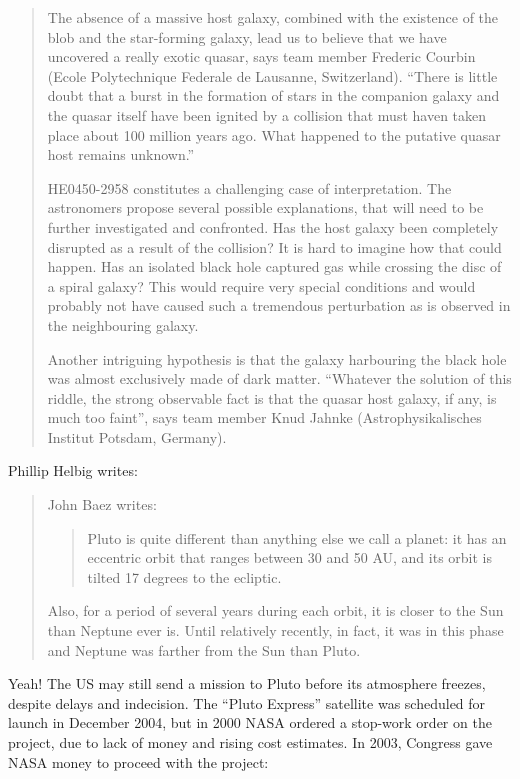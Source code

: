 \documentclass{article}
\begin{document}
\begin{quote}
The absence of a massive host galaxy, combined with the existence of the
blob and the star-forming galaxy, lead us to believe that we have
uncovered a really exotic quasar, says team member Frederic Courbin
(Ecole Polytechnique Federale de Lausanne, Switzerland). ``There is
little doubt that a burst in the formation of stars in the companion
galaxy and the quasar itself have been ignited by a collision that must
haven taken place about 100 million years ago. What happened to the
putative quasar host remains unknown.''

HE0450-2958 constitutes a challenging case of interpretation. The
astronomers propose several possible explanations, that will need to be
further investigated and confronted. Has the host galaxy been completely
disrupted as a result of the collision? It is hard to imagine how that
could happen. Has an isolated black hole captured gas while crossing the
disc of a spiral galaxy? This would require very special conditions and
would probably not have caused such a tremendous perturbation as is
observed in the neighbouring galaxy.

Another intriguing hypothesis is that the galaxy harbouring the black
hole was almost exclusively made of dark matter. ``Whatever the solution
of this riddle, the strong observable fact is that the quasar host
galaxy, if any, is much too faint'', says team member Knud Jahnke
(Astrophysikalisches Institut Potsdam, Germany).
\end{quote}

Phillip Helbig writes:

\begin{quote}
John Baez writes:

\begin{quote}
Pluto is quite different than anything else we call a planet: it has an
eccentric orbit that ranges between 30 and 50 AU, and its orbit is
tilted 17 degrees to the ecliptic.
\end{quote}

Also, for a period of several years during each orbit, it is closer to
the Sun than Neptune ever is. Until relatively recently, in fact, it was
in this phase and Neptune was farther from the Sun than Pluto.
\end{quote}

Yeah! The US may still send a mission to Pluto before its atmosphere
freezes, despite delays and indecision. The ``Pluto Express'' satellite
was scheduled for launch in December 2004, but in 2000 NASA ordered a
stop-work order on the project, due to lack of money and rising cost
estimates. In 2003, Congress gave NASA money to proceed with the
project:
\end{document}
